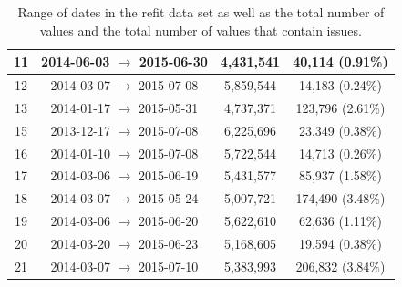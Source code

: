 \begin{table}[H]
\begin{adjustwidth*}{-3.0cm}{-3.0cm}
\begin{tabular}{cccc}
                        11                        & 2014-06-03 $\rightarrow$ 2015-06-30 & 4,431,541                       & 40,114 (0.91\%)                    \\ \midrule
                        12                        & 2014-03-07 $\rightarrow$ 2015-07-08 & 5,859,544                       & 14,183 (0.24\%)                    \\ \midrule
                        13                        & 2014-01-17 $\rightarrow$ 2015-05-31 & 4,737,371                       & 123,796 (2.61\%)                   \\ \midrule
                        15                        & 2013-12-17 $\rightarrow$ 2015-07-08 & 6,225,696                       & 23,349 (0.38\%)                    \\ \midrule
                        16                        & 2014-01-10 $\rightarrow$ 2015-07-08 & 5,722,544                       & 14,713 (0.26\%)                    \\ \midrule
                        17                        & 2014-03-06 $\rightarrow$ 2015-06-19 & 5,431,577                       & 85,937 (1.58\%)                    \\ \midrule
                        18                        & 2014-03-07 $\rightarrow$ 2015-05-24 & 5,007,721                       & 174,490 (3.48\%)                   \\ \midrule
                        19                        & 2014-03-06 $\rightarrow$ 2015-06-20 & 5,622,610                       & 62,636 (1.11\%)                    \\ \midrule
                        20                        & 2014-03-20 $\rightarrow$ 2015-06-23 & 5,168,605                       & 19,594 (0.38\%)                    \\ \midrule
                        21                        & 2014-03-07 $\rightarrow$ 2015-07-10 & 5,383,993                       & 206,832 (3.84\%)                   \\ \bottomrule
                \end{tabular}
                \caption{Range of dates in the \gls{refit} data set as well as the total number of values and the total number of values that contain issues.}
                \label{tab:REFIT-values-recorded}
        \end{adjustwidth*}
\end{table}

